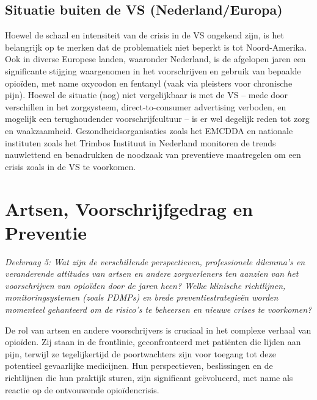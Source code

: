 \documentclass[11pt, a4paper]{report} %
\begin{document}
\section{Situatie buiten de VS (Nederland/Europa)}
Hoewel de schaal en intensiteit van de crisis in de VS ongekend zijn, is het belangrijk op te merken dat de problematiek niet beperkt is tot Noord-Amerika. Ook in diverse Europese landen, waaronder Nederland, is de afgelopen jaren een significante stijging waargenomen in het voorschrijven en gebruik van bepaalde opioïden, met name oxycodon en fentanyl (vaak via pleisters voor chronische pijn). Hoewel de situatie (nog) niet vergelijkbaar is met de VS – mede door verschillen in het zorgsysteem, direct-to-consumer advertising verboden, en mogelijk een terughoudender voorschrijfcultuur – is er wel degelijk reden tot zorg en waakzaamheid. Gezondheidsorganisaties zoals het EMCDDA en nationale instituten zoals het Trimbos Instituut in Nederland monitoren de trends nauwlettend en benadrukken de noodzaak van preventieve maatregelen om een crisis zoals in de VS te voorkomen.


\chapter{Artsen, Voorschrijfgedrag en Preventie}
\label{chap:artsen_preventie}
\textit{Deelvraag 5: Wat zijn de verschillende perspectieven, professionele dilemma's en veranderende attitudes van artsen en andere zorgverleners ten aanzien van het voorschrijven van opioïden door de jaren heen? Welke klinische richtlijnen, monitoringsystemen (zoals PDMPs) en brede preventiestrategieën worden momenteel gehanteerd om de risico's te beheersen en nieuwe crises te voorkomen?}

De rol van artsen en andere voorschrijvers is cruciaal in het complexe verhaal van opioïden. Zij staan in de frontlinie, geconfronteerd met patiënten die lijden aan pijn, terwijl ze tegelijkertijd de poortwachters zijn voor toegang tot deze potentieel gevaarlijke medicijnen. Hun perspectieven, beslissingen en de richtlijnen die hun praktijk sturen, zijn significant geëvolueerd, met name als reactie op de ontvouwende opioïdencrisis.
\end{document}

